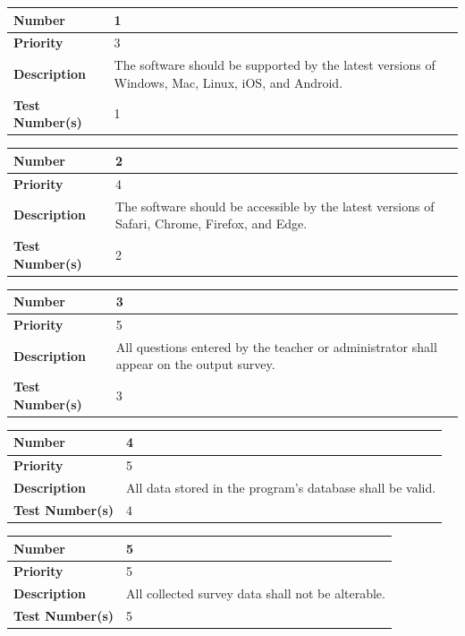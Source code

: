 \documentclass{article}
\begin{document}
\begin{center}
\begin{tabular}{|p{3.5cm}|p{7.5cm}|} 
\hline
\textbf{Number} & 1  \\
\hline
\textbf{Priority} & 3\\ 
\hline
\textbf{Description} & The software should be supported by the latest versions of Windows, Mac, Linux, iOS, and Android. \\ 
\hline
\textbf{Test Number(s) }& 1 \\ 
\hline
\end{tabular}

\bigskip
{}
\begin{tabular}{|p{3.5cm}|p{7.5cm}|} 
\hline
\textbf{Number} & 2  \\
\hline
\textbf{Priority} & 4\\ 
\hline
\textbf{Description} & The software should be accessible by the latest versions of Safari, Chrome, Firefox, and Edge. \\ 
\hline
\textbf{Test Number(s) }& 2 \\ 
\hline
\end{tabular}


\bigskip
{}
\begin{tabular}{|p{3.5cm}|p{7.5cm}|} 
\hline
\textbf{Number} & 3  \\
\hline
\textbf{Priority} & 5\\ 
\hline
\textbf{Description} & All questions entered by the teacher or administrator shall appear on the output survey. \\ 
\hline
\textbf{Test Number(s) }& 3 \\ 
\hline
\end{tabular}


\bigskip
{}
\begin{tabular}{|p{3.5cm}|p{7.5cm}|} 
\hline
\textbf{Number} & 4  \\
\hline
\textbf{Priority} & 5\\ 
\hline
\textbf{Description} & All data stored in the program's database shall be valid. \\ 
\hline
\textbf{Test Number(s) }& 4 \\ 
\hline
\end{tabular}


\bigskip
{}
\begin{tabular}{|p{3.5cm}|p{7.5cm}|} 
\hline
\textbf{Number} & 5  \\
\hline
\textbf{Priority} & 5\\ 
\hline
\textbf{Description} & All collected survey data shall not be alterable.\\ 
\hline
\textbf{Test Number(s) }& 5 \\ 
\hline
\end{tabular}



\end{center}
\end{document}
